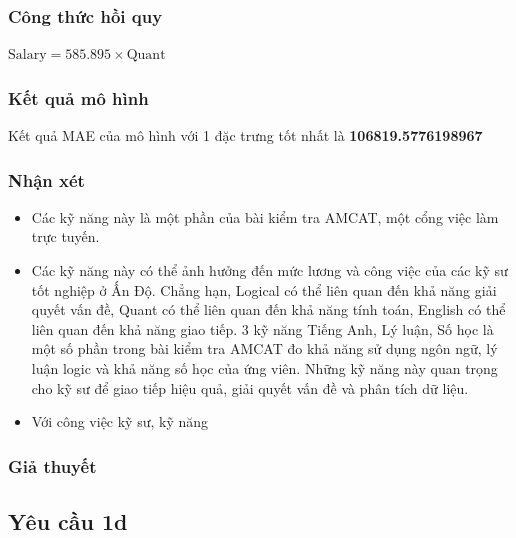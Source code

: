 \documentclass[]{article}
\begin{document}
\subsubsection{Công thức hồi quy}
$\text{Salary} = 585.895 \times \text{Quant}$
\subsubsection{Kết quả mô hình}
\begin{table}[!h]
  \centering
\end{table}
Kết quả MAE của mô hình với 1 đặc trưng tốt nhất là \textbf{106819.5776198967}

\subsubsection{Nhận xét}
\begin{itemize}
  \item Các kỹ năng này là một phần của bài kiểm tra AMCAT, một cổng việc làm trực tuyến. \cite{kaggleEngineeringGraduate}
  \item Các kỹ năng này có thể ảnh hưởng đến mức lương và công việc của các kỹ sư tốt nghiệp ở Ấn Độ. Chẳng hạn, Logical có thể liên quan đến khả năng giải quyết vấn đề, Quant có thể liên quan đến khả năng tính toán, English có thể liên quan đến khả năng giao tiếp. 3 kỹ năng Tiếng Anh, Lý luận, Số học là một số phần trong bài kiểm tra AMCAT đo khả năng sử dụng ngôn ngữ, lý luận logic và khả năng số học của ứng viên. Những kỹ năng này quan trọng cho kỹ sư để giao tiếp hiệu quả, giải quyết vấn đề và phân tích dữ liệu. 
  \item Với công việc kỹ sư, kỹ năng 

\end{itemize}
  
\subsubsection{Giả thuyết}

\subsection{Yêu cầu 1d}

\newpage
\printbibliography[heading=mybibintoc]
\end{document}
